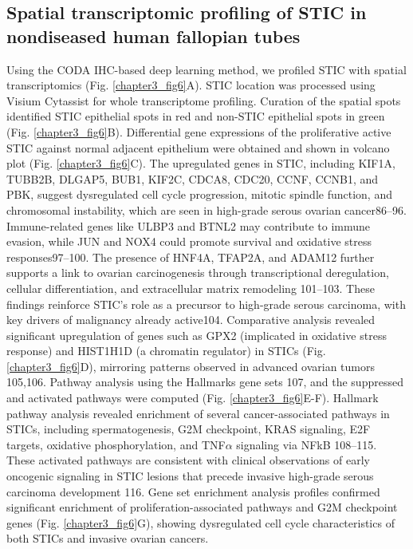 \begin{refsection}
    \subsection{Spatial transcriptomic profiling of STIC in nondiseased human fallopian tubes}
    Using the CODA IHC-based deep learning method, we profiled STIC with spatial transcriptomics (Fig. \ref{chapter3_fig6}A). STIC location was processed using Visium Cytassist for whole transcriptome profiling. Curation of the spatial spots identified STIC epithelial spots in red and non-STIC epithelial spots in green (Fig. \ref{chapter3_fig6}B).
    Differential gene expressions of the proliferative active STIC against normal adjacent epithelium were obtained and shown in volcano plot (Fig. \ref{chapter3_fig6}C). The upregulated genes in STIC, including KIF1A, TUBB2B, DLGAP5, BUB1, KIF2C, CDCA8, CDC20, CCNF, CCNB1, and PBK, suggest dysregulated cell cycle progression, mitotic spindle function, and chromosomal instability, which are seen in high-grade serous ovarian cancer\cite{Zhang2021Knockdown,Schneider2017AURKA,Hosea2024two,Chong2018Deregulation,Moura2014High,Yang2022CCNB1,Chen2025Tumor,Ikeda2016T,Comisso2017OCT4,Tang2021Pan,Fu2020Computational}86–96.  Immune-related genes like ULBP3 and BTNL2 may contribute to immune evasion, while JUN and NOX4 could promote survival and oxidative stress responses\cite{Sun2025NOX4,Du2022Cancer,McGilvray2010ULBP2,Wang1999Microtubule}97–100. The presence of HNF4A, TFAP2A, and ADAM12 further supports a link to ovarian carcinogenesis through transcriptional deregulation, cellular differentiation, and extracellular matrix remodeling\cite{Mai2021Histone,Du2015Screening,Cheon2015ADAM12} 101–103. These findings reinforce STIC’s role as a precursor to high-grade serous carcinoma, with key drivers of malignancy already active\cite{Schweizer2025Spatial}104. Comparative analysis revealed significant upregulation of genes such as GPX2 (implicated in oxidative stress response) and HIST1H1D (a chromatin regulator) in STICs (Fig. \ref{chapter3_fig6}D), mirroring patterns observed in advanced ovarian tumors\cite{Wang2019GPX2,Parssinen2008Identification} 105,106.
    Pathway analysis using the Hallmarks gene sets\cite{Liberzon2015Molecular} 107, and the suppressed and activated pathways were computed (Fig. \ref{chapter3_fig6}E-F). Hallmark pathway analysis revealed enrichment of several cancer-associated pathways in STICs, including spermatogenesis, G2M checkpoint, KRAS signaling, E2F targets, oxidative phosphorylation, and TNF$\alpha$ signaling via NFkB\cite{Chang2025Integrated,Rohozinski2009Spermatogenesis,Ouyang2009Genistein,Hendrikse2023potential,Zhan2016E2F1,Nayak2018Oxidative,Maccio2012Inflammation, Harrington2019NF} 108–115. These activated pathways are consistent with clinical observations of early oncogenic signaling in STIC lesions that precede invasive high-grade serous carcinoma development\cite{Weigert2025cell} 116. Gene set enrichment analysis profiles confirmed significant enrichment of proliferation-associated pathways and G2M checkpoint genes (Fig. \ref{chapter3_fig6}G), showing dysregulated cell cycle characteristics of both STICs and invasive ovarian cancers.

\end{refsection}
